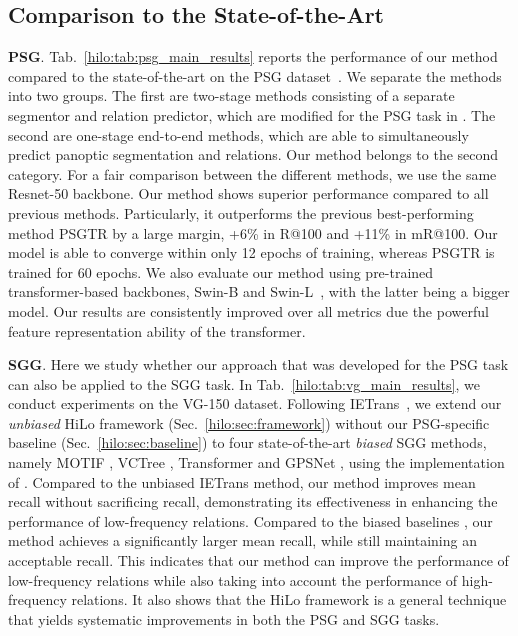 \subsection{Comparison to the State-of-the-Art}
\label{hilo:sec:experiments:main_results}

\noindent \textbf{PSG}. 
Tab.~\ref{hilo:tab:psg_main_results} reports the performance of our method compared to the state-of-the-art on the PSG dataset~\citep{yang2022panoptic}.
We separate the methods into two groups. 
The first are two-stage methods consisting of a separate segmentor and relation predictor, which are modified for the PSG task in \citep{yang2022panoptic}.
The second are one-stage end-to-end methods, which are able to simultaneously predict panoptic segmentation and relations.
Our method belongs to the second category.
For a fair comparison between the different methods, we use the same Resnet-50 \citep{he2016deep} backbone.
%
Our method shows superior performance compared to all previous methods.
Particularly, it outperforms the previous best-performing method PSGTR \citep{yang2022panoptic} by a large margin, \ie +6\% in R@100 and +11\% in mR@100.
Our model is able to converge within only 12 epochs of training, whereas PSGTR \citep{yang2022panoptic} is trained for 60 epochs.
%
We also evaluate our method using pre-trained transformer-based backbones, \ie Swin-B and Swin-L~\citep{liu2021swin}, with the latter being a bigger model.
Our results are consistently improved over all metrics due the powerful feature representation ability of the transformer.

\noindent \textbf{SGG}.
Here we study whether our approach that was developed for the PSG task can also be applied to the SGG task.
In Tab.~\ref{hilo:tab:vg_main_results}, we conduct experiments on the VG-150 dataset.
Following IETrans~\citep{zhang2022fine}, we extend our \emph{unbiased} HiLo framework (Sec.~\ref{hilo:sec:framework}) without our PSG-specific baseline (Sec.~\ref{hilo:sec:baseline}) to four state-of-the-art \emph{biased} SGG methods, namely MOTIF \citep{zellers2018neural}, VCTree \citep{tang2019learning}, Transformer \citep{tang2020unbiased} and GPSNet \citep{lin2020gps}, using the implementation of \citep{zhang2022fine}.
%
Compared to the unbiased IETrans \citep{zhang2022fine} method, our method improves mean recall without sacrificing recall, demonstrating its effectiveness in enhancing the performance of low-frequency relations.
%
Compared to the biased baselines \citep{zellers2018neural, tang2019learning, tang2020unbiased, lin2020gps}, our method achieves a significantly larger mean recall, while still maintaining an acceptable recall.
%
This indicates that our method can improve the performance of low-frequency relations while also taking into account the performance of high-frequency relations.
%
It also shows that the HiLo framework is a general technique that yields systematic improvements in both the PSG and SGG tasks.

